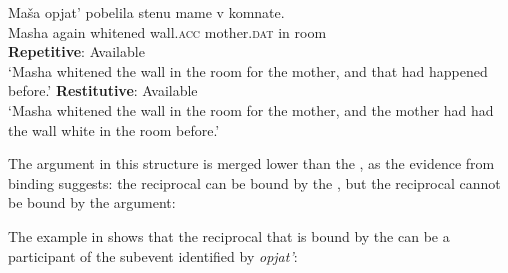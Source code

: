 \documentclass[output=paper]{langscibook}
\begin{document}
 \ea\label{ex:bondarenko:38}
\gll Maša opjat’ pobelila stenu mame v komnate.\\
     Masha again whitened wall.\textsc{acc} mother.\textsc{dat} in room\\
\ea \textbf{Repetitive}: Available\\
`Masha whitened the wall in the room for the mother, and that   had happened before.'
\ex \textbf{Restitutive}: Available\\
`Masha whitened the wall in the room for the mother, and the   mother had had the wall white in the room before.'
\z\z


\noindent The  argument in this structure is merged lower than the , as the evidence from binding suggests: the  reciprocal can be bound by the , but the  reciprocal cannot be bound by the  argument:


 \ea\label{ex:bondarenko:39}
 \label{ex:bondarenko:40}
\z\z

\noindent The example in  shows that the  reciprocal that is bound by the  can be a participant of the  subevent identified by \textit{opjat’}:
\end{document}
